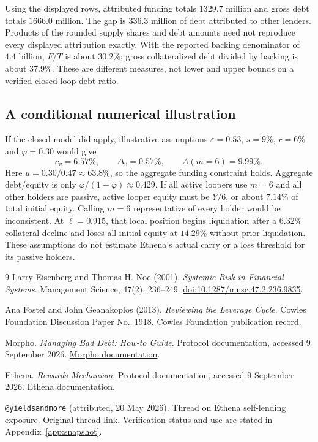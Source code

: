\documentclass[12pt,oneside]{article}
\begin{document}
Using the displayed rows, attributed funding totals $1329.7$ million
and gross debt totals $1666.0$ million. The gap is $336.3$ million of
debt attributed to other lenders. Products of the rounded supply shares
and debt amounts need not reproduce every displayed attribution exactly.
With the reported backing denominator of $4.4$ billion, $F/T$ is about
$30.2\%$; gross collateralized debt divided by backing is about $37.9\%$.
These are different measures, not lower and upper bounds on a verified
closed-loop debt ratio.

\subsection{A conditional numerical illustration}
If the closed model did apply, illustrative assumptions
$\varepsilon=0.53$, $s=9\%$, $r=6\%$ and $\varphi=0.30$ would give
\[
 c_v=6.57\%,\qquad \Delta_v=0.57\%,\qquad
 A(m=6)=9.99\%.
\]
Here $u=0.30/0.47\approx63.8\%$, so the aggregate funding constraint
holds. Aggregate debt/equity is only $\varphi/(1-\varphi)\approx0.429$.
If all active loopers use $m=6$ and all other holders are passive, active
looper equity must be $Y/6$, or about $7.14\%$ of total initial equity.
Calling $m=6$ representative of every holder would be inconsistent.
At $\ell=0.915$, that local position begins liquidation after a
$6.32\%$ collateral decline and loses all initial equity at $14.29\%$
without prior liquidation. These assumptions do not estimate Ethena's
actual carry or a loss threshold for its passive holders.


\clearpage
\begin{thebibliography}{9}
Larry Eisenberg and Thomas H. Noe (2001).
\emph{Systemic Risk in Financial Systems}.
Management Science, 47(2), 236--249.
\href{https://doi.org/10.1287/mnsc.47.2.236.9835}{doi:10.1287/mnsc.47.2.236.9835}.

Ana Fostel and John Geanakoplos (2013).
\emph{Reviewing the Leverage Cycle}.
Cowles Foundation Discussion Paper No.\ 1918.
\href{https://cowles.yale.edu/node/139539}{Cowles Foundation publication record}.

Morpho. \emph{Managing Bad Debt: How-to Guide}.
Protocol documentation, accessed 9 September 2026.
\href{https://docs.morpho.org/curate/tutorials-v1/bad-debt/}{Morpho documentation}.

Ethena. \emph{Rewards Mechanism}.
Protocol documentation, accessed 9 September 2026.
\href{https://docs.ethena.fi/protocol-overview/rewards-mechanism}{Ethena documentation}.

\texttt{@yieldsandmore} (attributed, 20 May 2026).
Thread on Ethena self-lending exposure.
\href{https://x.com/yieldsandmore/status/2057150511883710628}{Original thread link}.
Verification status and use are stated in Appendix~\ref{app:snapshot}.
\end{thebibliography}
\end{document}
